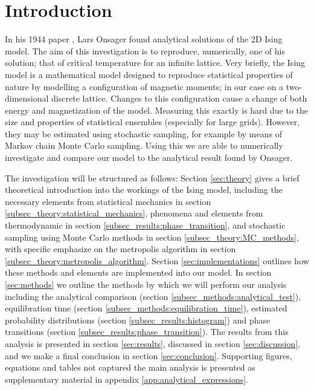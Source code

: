 \section{Introduction}\label{sec:introduction}

In his 1944 paper \cite{Onsager_Ising2D}, Lars Onsager found analytical solutions of the 2D Ising model. The aim of this investigation is to reproduce, numerically, one of his solution; that of critical temperature for an infinite lattice. Very briefly, the Ising model is a mathematical model designed to reproduce statistical properties of nature by modelling a configuration of magnetic moments; in our case on a two-dimensional discrete lattice. Changes to this configuration cause a change of both energy and magnetization of the model. Measuring this exactly is hard due to the size and properties of statistical ensembles (especially for large grids). However, they may be estimated using stochastic sampling, for example by means of Markov chain Monte Carlo sampling. Using this we are able to numerically investigate and compare our model to the analytical result found by Onsager. 

The investigation will be structured as follows: Section \ref{sec:theory} gives a brief theoretical introduction into the workings of the Ising model, including the necessary elements from statistical mechanics in section \ref{subsec_theory:statistical_mechanics}, phenomena and elements from thermodynamic in section \ref{subsec_results:phase_transition}, and stochastic sampling using Monte Carlo methods in section \ref{subsec_theory:MC_methods}, with specific emphasize on the metropolis algorithm in section \ref{subsec_theory:metropolis_algorithm}. Section \ref{sec:implementations} outlines how these methods and elements are implemented into our model. In section  \ref{sec:methods} we outline the methods by which we will perform our analysis including the analytical comparison (section \ref{subsec_methods:analytical_test}), equilibration time (section \ref{subsec_methods:equilibration_time}), estimated probability distributions (section \ref{subsec_results:histogram}) and phase transitions (section \ref{subsec_results:phase_transition}). The results from this analysis is presented in section \ref{sec:results}, discussed in section \ref{sec:discussion}, and we make a final conclusion in section \ref{sec:conclusion}. Supporting figures, equations and tables not captured the main analysis is presented as supplementary material in appendix \ref{app:analytical_expressions}.

